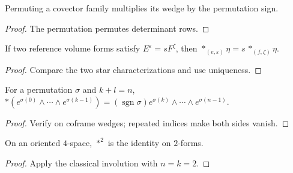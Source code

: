 \begin{lemma}
\label{lem:wedge-covectors-sign}
\leanok
{}
Permuting a covector family multiplies its wedge by the permutation sign.
\end{lemma}
\begin{proof}
\leanok
\sketch The permutation permutes determinant rows.
\end{proof}

\begin{lemma}
\label{lem:hodge-star-congr-smul}
\leanok
{}
If two reference volume forms satisfy $E^\varepsilon=sF^\zeta$, then $*_{(e,\varepsilon)}\eta=s\,*_{(f,\zeta)}\eta$.
\end{lemma}
\begin{proof}
\leanok
\sketch Compare the two star characterizations and use uniqueness.
\end{proof}

\begin{proposition}
\label{prop:hodge-star-basis-wedge}
\leanok
{}
For a permutation $\sigma$ and $k+l=n$, $*(e^{\sigma(0)}\wedge\cdots\wedge e^{\sigma(k-1)})=(\operatorname{sgn}\sigma)e^{\sigma(k)}\wedge\cdots\wedge e^{\sigma(n-1)}$.
\end{proposition}
\begin{proof}
\leanok
{}
\sketch Verify on coframe wedges; repeated indices make both sides vanish.
\end{proof}

\begin{proposition}
\label{prop:hodge-star-two-involution}
\leanok
{}
On an oriented $4$-space, $*^2$ is the identity on $2$-forms.
\end{proposition}
\begin{proof}
\leanok
\sketch Apply the classical involution with $n=k=2$.
\end{proof}

